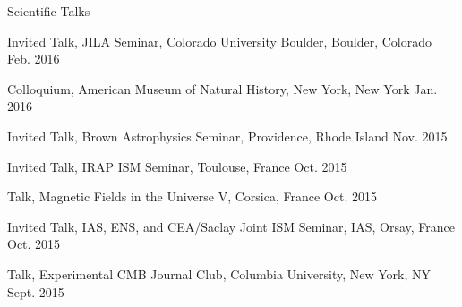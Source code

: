 \documentclass{resume_clark} %
\begin{document}
\begin{rSection}{Scientific Talks}
\begin{etaremune}[itemsep=-1.8mm]
\item Invited Talk, JILA Seminar, Colorado University Boulder, Boulder, Colorado \hfill {Feb. 2016}

\item Colloquium, American Museum of Natural History, New York, New York \hfill {Jan. 2016}

\item Invited Talk, Brown Astrophysics Seminar, Providence, Rhode Island \hfill {Nov. 2015}

\item Invited Talk, IRAP ISM Seminar, Toulouse, France \hfill{Oct. 2015}

\item Talk, Magnetic Fields in the Universe V, Corsica, France \hfill {Oct. 2015}

\item Invited Talk, IAS, ENS, and CEA/Saclay Joint ISM Seminar, IAS, Orsay, France \hfill {Oct. 2015}

\item Talk, Experimental CMB Journal Club, Columbia University, New York, NY \hfill {Sept. 2015}


\end{etaremune}
\end{rSection}
\end{document}
